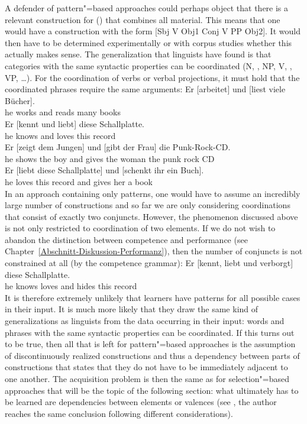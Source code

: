 A defender of pattern"=based approaches could perhaps object that there is a relevant construction for () that combines
all material. This means that one would have a construction with the form [Sbj V Obj1 Conj V PP Obj2].
It would then have to be determined experimentally or with corpus studies whether this actually makes sense.
The generalization that linguists have found is that categories with the same syntactic properties can be coordinated 
(N, \nbar, NP, V, \vbar, VP, \ldots). For the coordination of verbs or verbal projections, it must hold that the coordinated
phrases require the same arguments:
\eal
\ex 
\gll Er [arbeitet] und [liest viele Bücher].\\
     he \spacebr{}works and \spacebr{}reads many books\\
\ex 
\gll Er [kennt und liebt] diese Schallplatte.\\
     he \spacebr{}knows and loves this record\\
\ex 
\gll Er [zeigt dem Jungen] und [gibt der Frau] die Punk-Rock-CD.\\
     he \spacebr{}shows the boy and \spacebr{}gives the woman the {punk rock CD}\\
\ex 
\gll Er [liebt diese Schallplatte] und [schenkt ihr ein Buch].\\
     he \spacebr{}loves this record and \spacebr{}gives her a book\\
\zl
In an approach containing only patterns, one would have to assume an incredibly large number of constructions and so far we are
only considering coordinations that consist of exactly two conjuncts. However, the phenomenon discussed above is not only restricted
to coordination of two elements. If we do not wish to abandon the distinction between competence and performance
(see Chapter~\ref{Abschnitt-Diskussion-Performanz}), then the number of conjuncts is not constrained at all (by the competence grammar):
\ea
\gll Er [kennt, liebt und verborgt] diese Schallplatte.\\
	 he \spacebr{}knows loves and hides this record\\
\z
It is therefore extremely unlikely that learners have patterns for all possible cases in their input. It is much more likely that they draw
the same kind of generalizations as linguists from the data occurring in their input: words and phrases with the same syntactic
properties can be coordinated. 
If this turns out to be true, then all that is left for pattern"=based approaches is the assumption of discontinuously realized constructions
and thus a dependency between parts of constructions that states that they do not have to be immediately adjacent to one another.
The acquisition problem is then the same as for selection"=based approaches that will be the topic of the following section: what ultimately has
to be learned are dependencies between elements or valences (see , the author reaches the same conclusion
following different considerations).%
\indexcxgend

